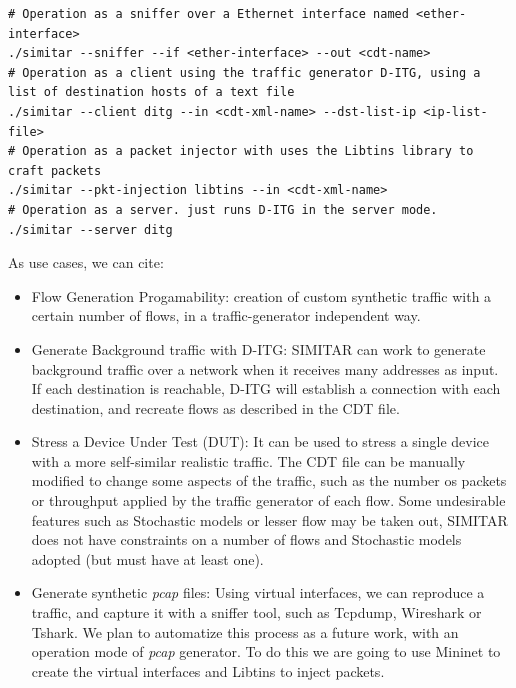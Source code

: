 \begin{verbatim}
# Operation as a sniffer over a Ethernet interface named <ether-interface> 
./simitar --sniffer --if <ether-interface> --out <cdt-name>
# Operation as a client using the traffic generator D-ITG, using a list of destination hosts of a text file
./simitar --client ditg --in <cdt-xml-name> --dst-list-ip <ip-list-file> 
# Operation as a packet injector with uses the Libtins library to craft packets
./simitar --pkt-injection libtins --in <cdt-xml-name> 
# Operation as a server. just runs D-ITG in the server mode.
./simitar --server ditg

\end{verbatim}

As use cases, we can cite:

\begin{itemize}

\item Flow Generation Progamability: creation of custom synthetic traffic with a certain number of flows, in a traffic-generator independent way.

\item Generate Background traffic with D-ITG: SIMITAR can work to generate background traffic over a network when it receives many addresses as input. If each destination is reachable, D-ITG will establish a connection with each destination, and recreate flows as described in the CDT file. 

\item Stress a Device Under Test (DUT): It can be used to stress a single device with a more self-similar realistic traffic. The CDT file can be manually modified to change some aspects of the traffic, such as the number os packets or throughput applied by the traffic generator of each flow. Some undesirable features such as Stochastic models or lesser flow may be taken out, SIMITAR does not have constraints on a number of flows and Stochastic models adopted (but must have at least one).

\item Generate synthetic \textit{pcap} files: Using virtual interfaces, we can reproduce a traffic, and capture it with a sniffer tool, such as Tcpdump, Wireshark or Tshark. We plan to automatize this process as a future work, with an operation mode of \textit{pcap} generator. To do this we are going to use Mininet to create the virtual interfaces and Libtins to inject packets.

\end{itemize}




